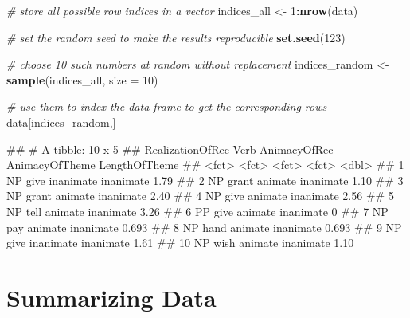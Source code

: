 \documentclass[
]{book}
\newenvironment{Shaded}{\begin{snugshade}}{\end{snugshade}}
\newcommand{\AttributeTok}[1]{\textcolor[rgb]{0.13,0.29,0.53}{#1}}
\newcommand{\CommentTok}[1]{\textcolor[rgb]{0.56,0.35,0.01}{\textit{#1}}}
\newcommand{\DecValTok}[1]{\textcolor[rgb]{0.00,0.00,0.81}{#1}}
\newcommand{\FunctionTok}[1]{\textcolor[rgb]{0.13,0.29,0.53}{\textbf{#1}}}
\newcommand{\NormalTok}[1]{#1}
\newcommand{\OtherTok}[1]{\textcolor[rgb]{0.56,0.35,0.01}{#1}}
\newcommand{\SpecialCharTok}[1]{\textcolor[rgb]{0.81,0.36,0.00}{\textbf{#1}}}
\begin{document}
\begin{Shaded}
\begin{Highlighting}[]
\CommentTok{\# store all possible row indices in a vector}
\NormalTok{indices\_all }\OtherTok{\textless{}{-}} \DecValTok{1}\SpecialCharTok{:}\FunctionTok{nrow}\NormalTok{(data)}

\CommentTok{\# set the random seed to make the results reproducible}
\FunctionTok{set.seed}\NormalTok{(}\DecValTok{123}\NormalTok{)}

\CommentTok{\# choose 10 such numbers at random without replacement}
\NormalTok{indices\_random }\OtherTok{\textless{}{-}} \FunctionTok{sample}\NormalTok{(indices\_all, }\AttributeTok{size =} \DecValTok{10}\NormalTok{)}

\CommentTok{\# use them to index the data frame to get the corresponding rows}
\NormalTok{data[indices\_random,]}
\end{Highlighting}
\end{Shaded}

\begin{Shaded}
\begin{Highlighting}[]
\NormalTok{\#\# \# A tibble: 10 x 5}
\NormalTok{\#\#    RealizationOfRec Verb  AnimacyOfRec AnimacyOfTheme LengthOfTheme}
\NormalTok{\#\#    \textless{}fct\textgreater{}            \textless{}fct\textgreater{} \textless{}fct\textgreater{}        \textless{}fct\textgreater{}                  \textless{}dbl\textgreater{}}
\NormalTok{\#\#  1 NP               give  inanimate    inanimate              1.79 }
\NormalTok{\#\#  2 NP               grant animate      inanimate              1.10 }
\NormalTok{\#\#  3 NP               grant animate      inanimate              2.40 }
\NormalTok{\#\#  4 NP               give  animate      inanimate              2.56 }
\NormalTok{\#\#  5 NP               tell  animate      inanimate              3.26 }
\NormalTok{\#\#  6 PP               give  animate      inanimate              0    }
\NormalTok{\#\#  7 NP               pay   animate      inanimate              0.693}
\NormalTok{\#\#  8 NP               hand  animate      inanimate              0.693}
\NormalTok{\#\#  9 NP               give  inanimate    inanimate              1.61 }
\NormalTok{\#\# 10 NP               wish  animate      inanimate              1.10}
\end{Highlighting}
\end{Shaded}

\hypertarget{summarizing-data}{%
\section{Summarizing Data}\label{summarizing-data}}
\end{document}

